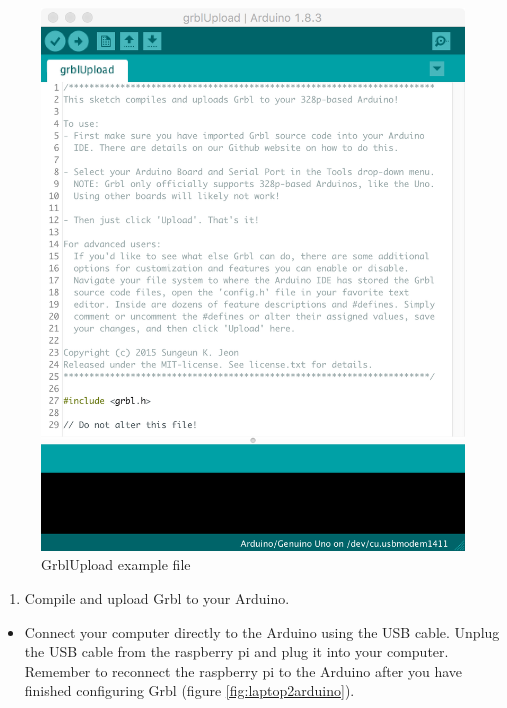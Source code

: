 \documentclass[
]{book}
\providecommand{\tightlist}{%
  \setlength{\itemsep}{0pt}\setlength{\parskip}{0pt}}
\begin{document}
\begin{figure}

{\centering \includegraphics[width=0.75\linewidth]{images/grbl_upload_file} 

}

\caption{GrblUpload example file}\label{fig:grblUploadFile}
\end{figure}

\begin{enumerate}
\def\labelenumi{\arabic{enumi}.}
\setcounter{enumi}{4}
\tightlist
\item
  Compile and upload Grbl to your Arduino.
\end{enumerate}

\begin{itemize}
\tightlist
\item
  Connect your computer directly to the Arduino using the USB cable. Unplug the USB cable from the raspberry pi and plug it into your computer. Remember to reconnect the raspberry pi to the Arduino after you have finished configuring Grbl (figure \ref{fig:laptop2arduino}).
\end{itemize}
\end{document}

